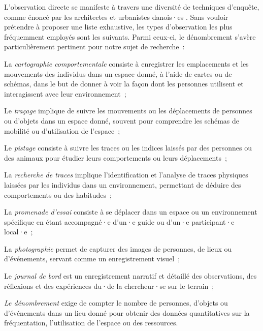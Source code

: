 \begin{refsegment}
L'observation directe se manifeste à travers une diversité de techniques d'enquête, comme énoncé par les architectes et urbanistes danois·es \textcolor{blue}{\textcite[101-118]{gehl_vie_2019}}. Sans vouloir prétendre à proposer une liste exhaustive, les types d'observation les plus fréquemment employés sont les suivants. Parmi ceux-ci, le dénombrement s'avère particulièrement pertinent pour notre sujet de recherche~:
    \begin{customitemize}
\item La \textsl{cartographie comportementale} consiste à enregistrer les emplacements et les mouvements des individus dans un espace donné, à l'aide de cartes ou de schémas, dans le but de donner à voir la façon dont les personnes utilisent et interagissent avec leur environnement~;
\item Le \textsl{traçage} implique de suivre les mouvements ou les déplacements de personnes ou d'objets dans un espace donné, souvent pour comprendre les schémas de mobilité ou d'utilisation de l'espace~;
\item Le \textsl{pistage} consiste à suivre les traces ou les indices laissés par des personnes ou des animaux pour étudier leurs comportements ou leurs déplacements~;
\item La \textsl{recherche de traces} implique l'identification et l'analyse de traces physiques laissées par les individus dans un environnement, permettant de déduire des comportements ou des habitudes~;
\item La \textsl{promenade d'essai} consiste à se déplacer dans un espace ou un environnement spécifique en étant accompagné·e d'un·e guide ou d'un·e participant·e local·e~;
\item La \textsl{photographie} permet de capturer des images de personnes, de lieux ou d'événements, servant comme un enregistrement visuel~;
\item Le \textsl{journal de bord} est un enregistrement narratif et détaillé des observations, des réflexions et des expériences du·de la chercheur·se sur le terrain~;
\item \textsl{Le dénombrement} exige de compter le nombre de personnes, d'objets ou d'événements dans un lieu donné pour obtenir des données quantitatives sur la fréquentation, l'utilisation de l'espace ou des ressources.
    \end{customitemize}%


\end{refsegment}
